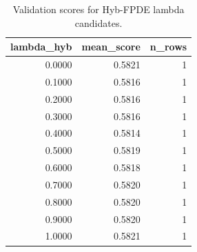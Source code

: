 \begin{table}[t]
\caption{Validation scores for Hyb-FPDE lambda candidates.}
\label{tab:lambda_distribution_computed}
\centering
\begin{tabular}{rrr}
\toprule
lambda\_hyb & mean\_score & n\_rows \\
\midrule
0.0000 & 0.5821 & 1 \\
0.1000 & 0.5816 & 1 \\
0.2000 & 0.5816 & 1 \\
0.3000 & 0.5816 & 1 \\
0.4000 & 0.5814 & 1 \\
0.5000 & 0.5819 & 1 \\
0.6000 & 0.5818 & 1 \\
0.7000 & 0.5820 & 1 \\
0.8000 & 0.5820 & 1 \\
0.9000 & 0.5820 & 1 \\
1.0000 & 0.5821 & 1 \\
\bottomrule
\end{tabular}

\end{table}
